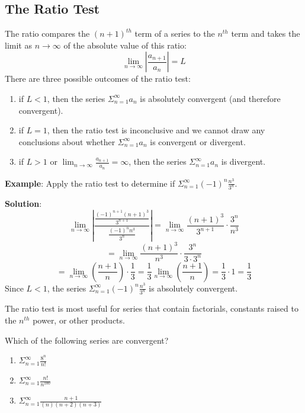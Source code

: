 \subsection{The Ratio Test}
The ratio compares the $(n + 1)^{th}$ term of a series to the $n^{th}$ term 
and takes the limit as $n \to \infty$ of the absolute value of this ratio:
$$\lim_{n \to \infty} \left| \frac{a_{n + 1}}{a_n} \right| = L$$
There are three possible outcomes of the ratio test:
\begin{enumerate}
\item if $L < 1$, then the series $\Sigma_{n=1}^\infty a_n$ is absolutely 
convergent (and therefore convergent).
\item if $L = 1$, then the ratio test is inconclusive and we cannot draw any 
conclusions about whether $\Sigma_{n=1}^\infty a_n$ is convergent or divergent.
\item if $L > 1$ or $\lim_{n \to \infty} \frac{a_{n + 1}}{a_n} = \infty$, then 
the series $\Sigma_{n=1}^\infty a_n$ is divergent.
\end{enumerate}

\textbf{Example}: Apply the ratio test to determine if $\Sigma_{n=1}^\infty 
(-1)^n \frac{n^3}{3^n}$.

\textbf{Solution}: 
$$\lim_{n \to \infty} \left| \frac{\frac{(-1)^{n + 1}(n + 1)^3}{3^{n + 1}}}{
\frac{(-1)^n n^3}{3^n}} \right| = \lim_{n \to \infty} \frac{(n + 1)^3}{3^{n + 
1}} \cdot \frac{3^n}{n^3}$$
$$= \lim_{n \to \infty} \frac{(n + 1)^3}{n^3} \cdot \frac{3^n}{3 \cdot 3^n}$$
$$= \lim_{n \to \infty} \left( \frac{n + 1}{n} \right) \cdot \frac{1}{3} = 
\frac{1}{3} \lim_{n \to \infty} \left( \frac{n + 1}{n} \right) = \frac{1}{3} 
\cdot 1 = \frac{1}{3} $$
Since $L < 1$, the series $\Sigma_{n=1}^\infty (-1)^n \frac{n^3}{3^n}$ is absolutely convergent. 

The ratio test is most useful for series that contain factorials, constants raised to the $n^{th}$ power, or other products. 

\begin{Exercise} Which of the following series are convergent?
\begin{enumerate}
\item $\Sigma_{n=1}^\infty \frac{8^n}{n!}$
\item $\Sigma_{n=1}^\infty \frac{n!}{n^{100}}$
\item $\Sigma_{n=1}^\infty \frac{n + 1}{(n)(n+2)(n+3)}$
\end{enumerate}
\end{Exercise}

